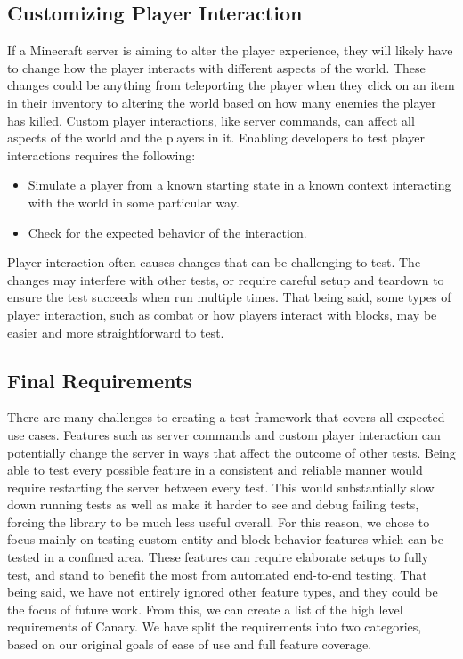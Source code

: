 \documentclass[12pt]{article}
\begin{document}
\begin{onehalfspacing}
\subsection{Customizing Player Interaction}

If a Minecraft server is aiming to alter the player experience, they
will likely have to change how the player interacts with different
aspects of the world. These changes could be anything from teleporting
the player when they click on an item in their inventory to altering the
world based on how many enemies the player has killed. Custom player
interactions, like server commands, can affect all aspects of the world
and the players in it. Enabling developers to test player interactions
requires the following:

\begin{itemize}
\item
  Simulate a player from a known starting state in a known context
  interacting with the world in some particular way.
\item
  Check for the expected behavior of the interaction.
\end{itemize}

Player interaction often causes changes that can be challenging to test.
The changes may interfere with other tests, or require careful setup and
teardown to ensure the test succeeds when run multiple times. That being
said, some types of player interaction, such as combat or how players
interact with blocks, may be easier and more straightforward to test.

\subsection{Final Requirements}

There are many challenges to creating a test framework that covers all
expected use cases. Features such as server commands and custom player
interaction can potentially change the server in ways that affect the
outcome of other tests. Being able to test every possible feature in a
consistent and reliable manner would require restarting the server
between every test. This would substantially slow down running tests as
well as make it harder to see and debug failing tests, forcing the
library to be much less useful overall. For this reason, we chose to
focus mainly on testing custom entity and block behavior features which
can be tested in a confined area. These features can require elaborate
setups to fully test, and stand to benefit the most from automated
end-to-end testing. That being said, we have not entirely ignored other
feature types, and they could be the focus of future work. From this, we
can create a list of the high level requirements of Canary. We have
split the requirements into two categories, based on our original goals
of ease of use and full feature coverage.


\end{onehalfspacing}
\end{document}

